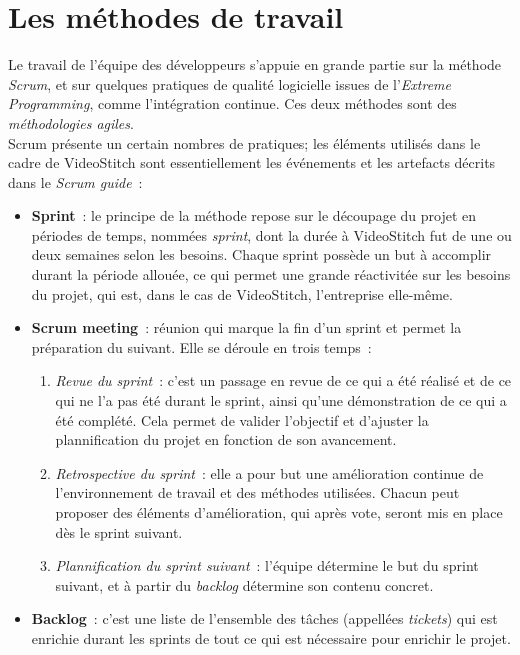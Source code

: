 \section{Les méthodes de travail}
Le travail de l'équipe des développeurs s'appuie en grande partie sur la méthode \emph{Scrum}, et
sur quelques pratiques de qualité logicielle issues de l'\textit{Extreme Programming}, comme l'intégration continue.
Ces deux méthodes sont des \emph{méthodologies agiles}\cite{methode-agile}.\\
\newline
Scrum présente un certain nombres de pratiques; les éléments utilisés 
dans le cadre de VideoStitch sont essentiellement les événements et les artefacts 
décrits dans le \textit{Scrum guide}\cite{scrum-guide}~:
\begin{itemize}
  \item \textbf{Sprint}~: le principe de la méthode repose sur le découpage du projet en 
	périodes de temps, nommées \emph{sprint}, dont la durée à VideoStitch fut de 
	une ou deux semaines selon les besoins. Chaque sprint possède un but à accomplir 
	durant la période allouée, ce qui permet une grande réactivitée sur les besoins 
	du projet, qui est, dans le cas de VideoStitch, l'entreprise elle-même.
	\item \textbf{Scrum meeting}~: réunion qui marque la fin d'un sprint et permet la préparation 
	du suivant. Elle se déroule en trois temps~:
	\begin{enumerate}
		\item \textit{Revue du sprint}~: c'est un passage en revue de ce qui a été réalisé
		et de ce qui ne l'a pas été durant le sprint, ainsi qu'une démonstration 
		de ce qui a été complété. Cela permet de valider l'objectif et d'ajuster 
		la plannification du projet en fonction de son avancement.
		\item \textit{Retrospective du sprint}~: elle a pour but une amélioration continue 
		de l'environnement de travail et des méthodes utilisées. Chacun peut proposer
		des éléments d'amélioration, qui après vote, seront mis en place dès le sprint
		suivant.
		\item \textit{Plannification du sprint suivant}~: l'équipe détermine le but du sprint
		suivant, et à partir du \textit{backlog} détermine son contenu concret.
	\end{enumerate}
  \item \textbf{Backlog}~: c'est une liste de l'ensemble des tâches (appellées \emph{tickets})
  qui est enrichie durant les sprints de tout ce qui est nécessaire pour enrichir le projet.

\end{itemize}
